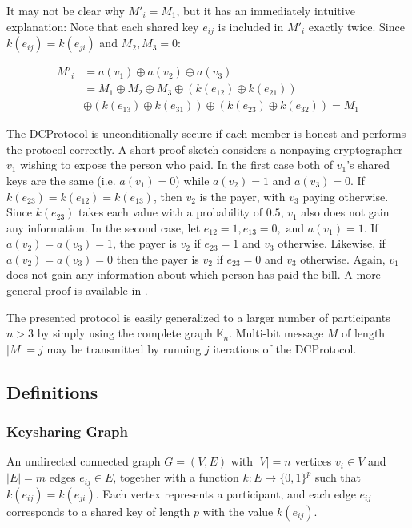 It may not be clear why $M'_i = M_1$, but it has an immediately intuitive explanation:
Note that each shared key $e_{ij}$ is included in $M'_i$ exactly twice.
Since $k(e_{ij}) = k(e_{ji})$ and $M_2, M_3 = 0$:

\begin{align*}
M'_i &= a(v_1) \oplus a(v_2) \oplus a(v_3) \\
     &= M_1 \oplus M_2 \oplus M_3
     \oplus (k(e_{12}) \oplus k(e_{21})) \\
     & \oplus (k(e_{13}) \oplus k(e_{31})) 
     \oplus (k(e_{23}) \oplus k(e_{32})) = M_1
\end{align*}

The \ac{DCProtocol} is unconditionally secure if each member is honest and performs the
protocol correctly. A short proof sketch considers a nonpaying cryptographer $v_1$
wishing to expose the person who paid. In the first case both of $v_1$'s shared keys are the same
(i.e. $a(v_1) = 0$) while $a(v_2) = 1$ and $a(v_3) = 0$. If $k(e_{23}) = k(e_{12}) = k(e_{13})$, then $v_2$
is the payer, with $v_3$ paying otherwise. Since $k(e_{23})$ takes each value with a probability
of $0.5$, $v_1$ also does not gain any information. In the second case, let $e_{12} = 1, e_{13} = 0, \text{ and } a(v_1) = 1$. If $a(v_2) = a(v_3) = 1$, the payer is $v_2$ if $e_{23} = 1$ and $v_3$ otherwise.
Likewise, if $a(v_2) = a(v_3) = 0$ then the payer is $v_2$ if $e_{23} = 0$ and $v_3$ otherwise.
Again, $v_1$ does not gain any information about which person has paid the bill.
A more general proof is available in \cite{journals/joc/Chaum88}.

The presented protocol is easily generalized to a larger number of participants $n > 3$ by simply
using the complete graph $\mathbb{K}_n$. Multi-bit message $M$ of length $|M| = j$
may be transmitted by running $j$ iterations of the \ac{DCProtocol}.  

\subsection{Definitions}

\subsubsection{Keysharing Graph}

An undirected connected graph $G = (V, E)$ with $|V| = n$ vertices $v_i \in V$ and $|E| = m$ edges $e_{ij} \in E$,
together with a function $k: E \rightarrow \{0, 1\}^p$ such that $k(e_{ij}) = k(e_{ji})$.
Each vertex represents a participant, and each edge $e_{ij}$ corresponds to a shared key of length $p$ with the value
$k(e_{ij})$.

